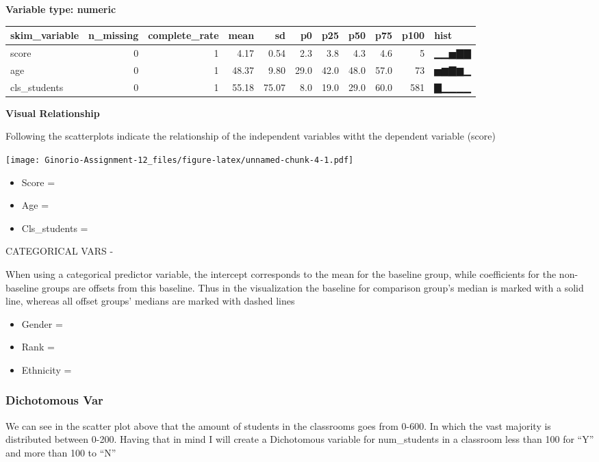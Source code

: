 \documentclass[
]{article}
\providecommand{\tightlist}{%
  \setlength{\itemsep}{0pt}\setlength{\parskip}{0pt}}
\begin{document}
\textbf{Variable type: numeric}

\begin{longtable}[]{@{}lrrrrrrrrrl@{}}
\toprule
skim\_variable & n\_missing & complete\_rate & mean & sd & p0 & p25 &
p50 & p75 & p100 & hist \\
\midrule
\endhead
score & 0 & 1 & 4.17 & 0.54 & 2.3 & 3.8 & 4.3 & 4.6 & 5 & ▁▁▅▇▇ \\
age & 0 & 1 & 48.37 & 9.80 & 29.0 & 42.0 & 48.0 & 57.0 & 73 & ▅▆▇▆▁ \\
cls\_students & 0 & 1 & 55.18 & 75.07 & 8.0 & 19.0 & 29.0 & 60.0 & 581 &
▇▁▁▁▁ \\
\bottomrule
\end{longtable}

\textbf{Visual Relationship}

Following the scatterplots indicate the relationship of the independent
variables witht the dependent variable (score)

\texttt{[image: Ginorio-Assignment-12\_files/figure-latex/unnamed-chunk-4-1.pdf]}

\begin{itemize}
\tightlist
\item
  Score =
\item
  Age =
\item
  Cls\_students =
\end{itemize}

CATEGORICAL VARS -

When using a categorical predictor variable, the intercept corresponds
to the mean for the baseline group, while coefficients for the
non-baseline groups are offsets from this baseline. Thus in the
visualization the baseline for comparison group's median is marked with
a solid line, whereas all offset groups' medians are marked with dashed
lines

\begin{itemize}
\tightlist
\item
  Gender =
\item
  Rank =
\item
  Ethnicity =
\end{itemize}

\hypertarget{dichotomous-var}{%
\subsubsection{Dichotomous Var}\label{dichotomous-var}}

We can see in the scatter plot above that the amount of students in the
classrooms goes from 0-600. In which the vast majority is distributed
between 0-200. Having that in mind I will create a Dichotomous variable
for num\_students in a classroom less than 100 for ``Y'' and more than
100 to ``N''
\end{document}
